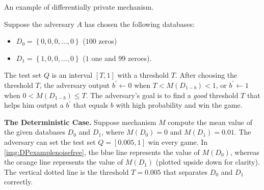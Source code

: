 \begin{protocol}[tbh!]
    \centering
    \caption{An example of differentially private mechanism.}
    \label{prot:motivationexampleDP}
\end{protocol}
\FloatBarrier

Suppose the adversary $A$ has chosen the following databases:
\begin{itemize}
    \item $D_{0}=\left\{ 0, 0, 0,\ldots ,0\right\} $ ($100$ zeros)
    \item $D_{1}=\left\{ 1, 0, 0,\ldots ,0\right\} $ ($1$ one and $99$ zeroes).
\end{itemize}

The test set $Q$ is an interval $\left[ T,1\right] $ with a threshold $T$. After choosing the threshold $T$, the adversary output $b^{\prime} \gets 0$ when $T<M\left( D_{1-b}\right) < 1$, or $b^{\prime} \gets 1$ when $0<M\left( D_{1-b}\right) \leq T$. The adversary's goal is to find a \textit{good} threshold $T$ that helps him output a $b^{\prime}$ that equals $b$ with high probability and win the game.

\textbf{The Deterministic Case.}
Suppose mechanism $M$ compute the mean value of the given databases $D_0$ and $D_1$, where $M\left( D_{0}\right) =0$ and $M\left( D_{1}\right) =0.01$. The adversary can set the test set $Q =\left[ 0.005,1\right] $ win every game. In \autoref{img:DPexamplenoisefree}, the blue line represents the value of $M\left( D_{0}\right)$, whereas the orange line represents the value of $M\left( D_{1}\right)$ (plotted upside down for clarity). The vertical dotted line is the threshold $T=0.005$ that separates $D_{0}$ and $D_{1}$ correctly.

